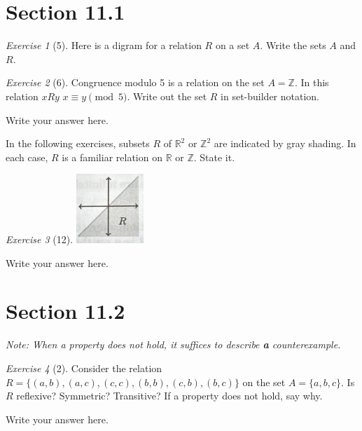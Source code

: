 \documentclass[12pt]{amsart}
\makeatletter
\theoremstyle{remark}
\newtheorem*{exercise}{Exercise}%
\def\RR{\ensuremath{\mathbb R}}
\def\ZZ{\ensuremath{\mathbb Z}}
\renewenvironment{proof}[1][\proofname]{\par\doublespacing
  \pushQED{\qed}%
  \normalfont \topsep6\p@\@plus6\p@\relax
  \list{}{%
    \settowidth{\leftmargin}{\itshape\proofname:\hskip\labelsep}%
    \setlength{\labelwidth}{0pt}%
    \setlength{\itemindent}{-\leftmargin}%
  }%
  \item[\hskip\labelsep\itshape#1\@addpunct{:}]\ignorespaces
}{%
  \popQED\endlist\@endpefalse
  \singlespacing
}
\theoremstyle{mycomment}
\makeatother
\begin{document}
\thispagestyle{fancy}

\section*{Section 11.1} 

\begin{exercise}[5] Here is a digram for a relation $R$ on a set $A$. Write the sets $A$ and $R$.
\begin{proof}[Solution]

\end{proof}
\end{exercise}
\begin{exercise}[6] Congruence modulo 5 is a relation on the set $A=\ZZ$. In this relation $xRy$ $x\equiv y\pmod 5$. Write out the set $R$ in set-builder notation.
\begin{proof}[Solution]
Write your answer here.
\end{proof}
\end{exercise}

In the following exercises, subsets $R$ of $\RR^{2}$ or $\ZZ^{2}$ are indicated by gray shading. In each case, $R$ is a familiar relation on $\RR$ or $\ZZ$. State it.
\begin{exercise}[12] \includegraphics[width=1in]{11p1p12.pdf}
\begin{proof}
Write your answer here.
\end{proof}
\end{exercise}
\section*{Section 11.2}
\emph{Note: When a property does not hold, it suffices to describe {\bf a} counterexample.}
\begin{exercise}[2] Consider the relation $R=\{(a,b),(a,c),(c,c),(b,b),(c,b), (b,c)\}$ on the set $A=\{a,b,c\}$. Is $R$ reflexive? Symmetric? Transitive? If a property does not hold, say why.
\begin{proof}[Solution]
Write your answer here.
\end{proof}
\end{exercise}
\end{document}

